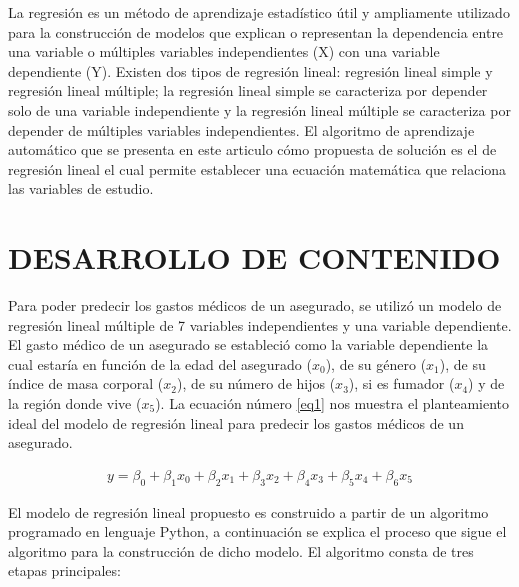 \documentclass[letterpaper, 10 pt, conference]{ieeeconf}
\begin{document}
La regresión es un método de aprendizaje estadístico útil y ampliamente utilizado para la construcción de modelos que explican o representan la dependencia entre una variable o múltiples variables independientes (X) con una variable dependiente (Y). Existen dos tipos de regresión lineal: regresión lineal simple y regresión lineal múltiple; la regresión lineal simple se caracteriza por depender solo de una variable independiente y la regresión lineal múltiple se caracteriza por depender de múltiples variables independientes. El algoritmo de aprendizaje automático que se presenta en este articulo cómo propuesta de solución es el de regresión lineal el cual permite establecer una ecuación matemática que relaciona las variables de estudio.

\section{DESARROLLO DE CONTENIDO}

Para poder predecir los gastos médicos de un asegurado, se utilizó un modelo de regresión lineal múltiple de 7 variables independientes y una variable dependiente. El gasto médico de un asegurado se estableció como la variable dependiente la cual estaría en función de la edad del asegurado ($x_0$), de su género ($x_1$), de su índice de masa corporal ($x_2$), de su número de hijos ($x_3$), si es fumador ($x_4$) y de la región donde vive ($x_5$). La ecuación número \ref{eq1} nos muestra el planteamiento ideal del modelo de regresión lineal para predecir los gastos médicos de un asegurado.

\begin{equation} \label{eq1}
\begin{split}
y = \beta_0 + \beta_1x_0 + \beta_2x_1
    + \beta_3x_2+ \beta_4x_3+ \beta_5x_4+ \beta_6x_5
\end{split}
\end{equation}

El modelo de regresión lineal propuesto es construido a partir de un algoritmo programado en lenguaje Python, a continuación se explica el proceso que sigue el algoritmo para la construcción de dicho modelo. El algoritmo consta de tres etapas principales:\\
\end{document}
